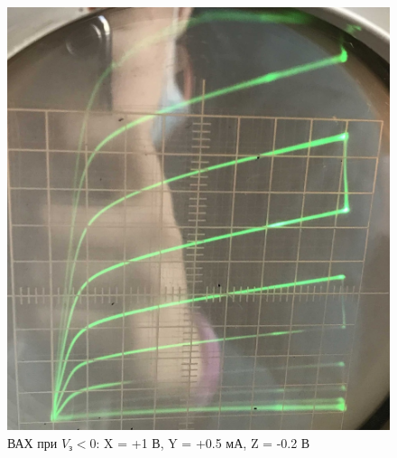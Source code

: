 \documentclass[a4paper]{article}
\begin{document}
\begin{figure}[h]
    \begin{center}
    \begin{minipage}[h]{0.4\linewidth}
        \includegraphics[width=1\linewidth]{p1.jpg}
        \caption{ВАХ при $V_з < 0$: X = +1 В, Y = +0.5 мА, Z = -0.2 В}
        \label{p1}
    \end{minipage}
    \hfill 
    \begin{minipage}[h]{0.4\linewidth}

\end{minipage}
\end{center}
\end{figure}
\end{document}
